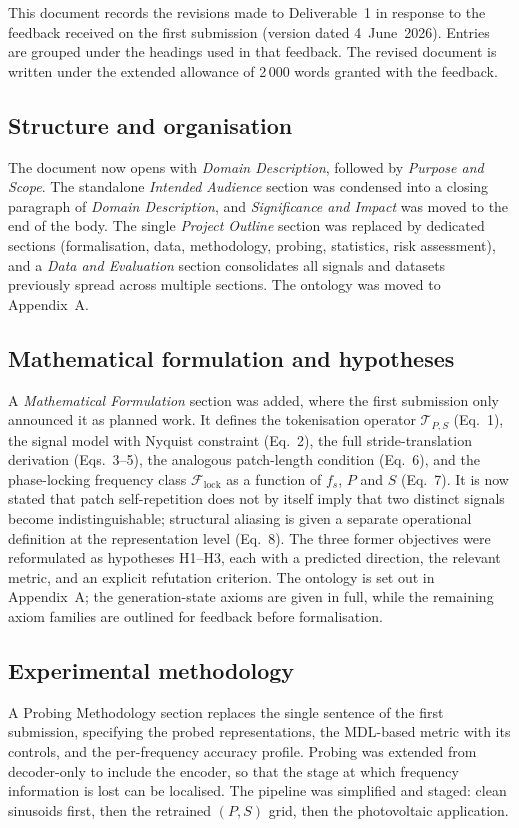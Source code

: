 \documentclass[
	letterpaper, %
	10pt, %
	unnumberedsections, %
	twoside, %
]{LTJournalArticle}
\begin{document}
This document records the revisions made to Deliverable~1 in response to the feedback received on the first submission (version dated 4~June~2026). Entries are grouped under the headings used in that feedback. The revised document is written under the extended allowance of 2\,000 words granted with the feedback.
 
\subsection{Structure and organisation}
The document now opens with \emph{Domain Description}, followed by \emph{Purpose and Scope}. The standalone \emph{Intended Audience} section was condensed into a closing paragraph of \emph{Domain Description}, and \emph{Significance and Impact} was moved to the end of the body. The single \emph{Project Outline} section was replaced by dedicated sections (formalisation, data, methodology, probing, statistics, risk assessment), and a \emph{Data and Evaluation} section consolidates all signals and datasets previously spread across multiple sections. The ontology was moved to Appendix~A.
 
\subsection{Mathematical formulation and hypotheses}
A \emph{Mathematical Formulation} section was added, where the first submission only announced it as planned work. It defines the tokenisation operator $\mathcal{T}_{P,S}$ (Eq.~1), the signal model with Nyquist constraint (Eq.~2), the full stride-translation derivation (Eqs.~3--5), the analogous patch-length condition (Eq.~6), and the phase-locking frequency class $\mathcal{F}_{\mathrm{lock}}$ as a function of $f_s$, $P$ and $S$ (Eq.~7). It is now stated that patch self-repetition does not by itself imply that two distinct signals become indistinguishable; structural aliasing is given a separate operational definition at the representation level (Eq.~8). The three former objectives were reformulated as hypotheses H1--H3, each with a predicted direction, the relevant metric, and an explicit refutation criterion. The ontology is set out in Appendix~A; the generation-state axioms are given in full, while the remaining axiom families are outlined for feedback before formalisation.
 
\subsection{Experimental methodology}
A Probing Methodology section replaces the single sentence of the first submission, specifying the probed representations, the MDL-based metric with its controls, and the per-frequency accuracy profile. Probing was extended from decoder-only to include the encoder, so that the stage at which frequency information is lost can be localised. The pipeline was simplified and staged: clean sinusoids first, then the retrained $(P,S)$ grid, then the photovoltaic application.
 
\end{document}
